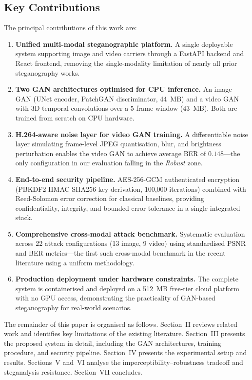 \documentclass[conference]{IEEEtran}
\begin{document}
\subsection{Key Contributions}

The principal contributions of this work are:

\begin{enumerate}
    \item \textbf{Unified multi-modal steganographic platform.} A
    single deployable system supporting image and video
    carriers through a FastAPI backend and React frontend, removing
    the single-modality limitation of nearly all prior steganography
    works.
    \item \textbf{Two GAN architectures optimised for CPU inference.}
    An image GAN (UNet encoder, PatchGAN discriminator, 44~MB) and
    a video GAN with 3D temporal convolutions over a 5-frame window
    (43~MB). Both are trained from scratch on CPU hardware.
    \item \textbf{H.264-aware noise layer for video GAN training.}
    A differentiable noise layer simulating frame-level JPEG
    quantisation, blur, and brightness perturbation enables the
    video GAN to achieve average BER of $0.148$—the only configuration
    in our evaluation falling in the \textit{Robust} zone.
    \item \textbf{End-to-end security pipeline.} AES-256-GCM
    authenticated encryption (PBKDF2-HMAC-SHA256 key derivation,
    100{,}000 iterations) combined with Reed-Solomon error correction
    for classical baselines, providing confidentiality, integrity,
    and bounded error tolerance in a single integrated stack.
    \item \textbf{Comprehensive cross-modal attack benchmark.}
    Systematic evaluation across 22 attack configurations (13 image,
    9 video) using standardised PSNR and BER metrics—the
    first such cross-modal benchmark in the recent literature using
    a uniform methodology.
    \item \textbf{Production deployment under hardware constraints.}
    The complete system is containerised and deployed on a 512~MB
    free-tier cloud platform with no GPU access, demonstrating the
    practicality of GAN-based steganography for real-world scenarios.
\end{enumerate}

The remainder of this paper is organised as follows. Section~II
reviews related work and identifies key limitations of the existing
literature. Section~III presents the proposed system in detail,
including the GAN architectures, training procedure, and security
pipeline. Section~IV presents the experimental setup and results.
Sections~V and~VI analyse the imperceptibility–robustness tradeoff
and steganalysis resistance. Section~VII concludes.
\end{document}
